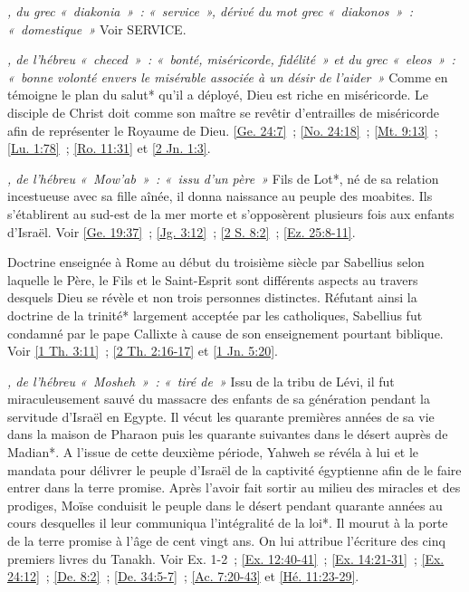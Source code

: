 \begin{multicols}{2}
\textit{, du grec «~diakonia~»~: «~service~», dérivé du mot grec «~diakonos~»~: «~domestique~»}\newline
Voir SERVICE.

\textit{, de l'hébreu «~checed~»~: «~bonté, miséricorde, fidélité~» et du grec «~eleos~»~: «~bonne volonté envers le misérable associée à un désir de l'aider~»}\newline
Comme en témoigne le plan du salut* qu'il a déployé, Dieu est riche en miséricorde. Le disciple de Christ doit comme son maître se revêtir d'entrailles de miséricorde afin de représenter le Royaume de Dieu. \vref{Ge. 24:7}~; \vref{No. 24:18}~; \vref{Mt. 9:13}~; \vref{Lu. 1:78}~; \vref{Ro. 11:31} et \vref{2 Jn. 1:3}.

\textit{, de l'hébreu «~Mow'ab~»~: «~issu d'un père~»}\newline
Fils de Lot*, né de sa relation incestueuse avec sa fille aînée, il donna naissance au peuple des moabites. Ils s'établirent au sud-est de la mer morte et s'opposèrent plusieurs fois aux enfants d'Israël. Voir \vref{Ge. 19:37}~; \vref{Jg. 3:12}~; \vref{2 S. 8:2}~; \vref{Ez. 25:8-11}.

\textit{}\newline
Doctrine enseignée à Rome au début du troisième siècle par Sabellius selon laquelle le Père, le Fils et le Saint-Esprit sont différents aspects au travers desquels Dieu se révèle et non trois personnes distinctes. Réfutant ainsi la doctrine de la trinité* largement acceptée par les catholiques, Sabellius fut condamné par le pape Callixte à cause de son enseignement pourtant biblique. Voir \vref{1 Th. 3:11}~; \vref{2 Th. 2:16-17} et \vref{1 Jn. 5:20}.

\textit{, de l'hébreu «~Mosheh~»~: «~tiré de~»}\newline
Issu de la tribu de Lévi, il fut miraculeusement sauvé du massacre des enfants de sa génération pendant la servitude d'Israël en Egypte. Il vécut les quarante premières années de sa vie dans la maison de Pharaon puis les quarante suivantes dans le désert auprès de Madian*. A l'issue de cette deuxième période, Yahweh se révéla à lui et le mandata pour délivrer le peuple d'Israël de la captivité égyptienne afin de le faire entrer dans la terre promise. Après l'avoir fait sortir au milieu des miracles et des prodiges, Moïse conduisit le peuple dans le désert pendant quarante années au cours desquelles il leur communiqua l'intégralité de la loi*. Il mourut à la porte de la terre promise à l'âge de cent vingt ans. On lui attribue l'écriture des cinq premiers livres du Tanakh. Voir Ex. 1-2~; \vref{Ex. 12:40-41}~; \vref{Ex. 14:21-31}~; \vref{Ex. 24:12}~; \vref{De. 8:2}~; \vref{De. 34:5-7}~; \vref{Ac. 7:20-43} et \vref{Hé. 11:23-29}.


\end{multicols}
